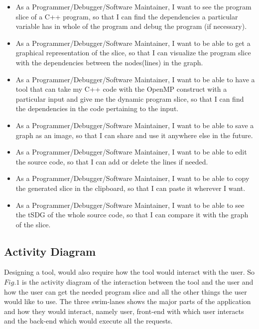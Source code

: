 \documentclass[conference]{IEEEtran}
\begin{document}
\begin{itemize}
    \item As a Programmer/Debugger/Software Maintainer, I want to see the program slice of a C++ program, so that I can find the dependencies a particular variable has in whole of the program and debug the program (if necessary).
    \item As a Programmer/Debugger/Software Maintainer, I want to be able to get a graphical representation of the slice, so that I can visualize the program slice with the dependencies between the nodes(lines) in the graph.
    \item As a Programmer/Debugger/Software Maintainer, I want to be able to have a tool that can take my C++ code with the OpenMP construct with a particular input and give me the dynamic program slice, so that I can find the dependencies in the code pertaining to the input.
    \item As a Programmer/Debugger/Software Maintainer, I want to be able to save a graph as an image, so that I can share and use it anywhere else in the future.
    \item As a Programmer/Debugger/Software Maintainer, I want to be able to edit the source code, so that I can add or delete the lines if needed.
    \item As a Programmer/Debugger/Software Maintainer, I want to be able to copy the generated slice in the clipboard, so that I can paste it wherever I want.
    \item As a Programmer/Debugger/Software Maintainer, I want to be able to see the tSDG of the whole source code, so that I can compare it with the graph of the slice.
\end{itemize}
\subsection{Activity Diagram}
Designing a tool, would also require how the tool would interact with the user. So $Fig. 1$ is the activity diagram of the interaction between the tool and the user and how the user can get the needed program slice and all the other things the user would like to use. The three swim-lanes shows the major parts of the application and how they would interact, namely user, front-end with which user interacts and the back-end which would execute all the requests.

\end{document}
